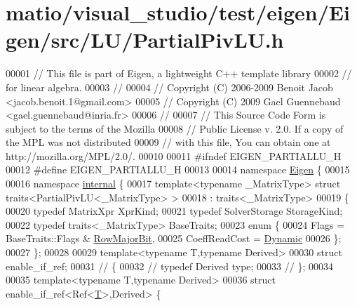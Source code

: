 \hypertarget{matio_2visual__studio_2test_2eigen_2_eigen_2src_2_l_u_2_partial_piv_l_u_8h_source}{}\section{matio/visual\+\_\+studio/test/eigen/\+Eigen/src/\+L\+U/\+Partial\+Piv\+LU.h}
\label{matio_2visual__studio_2test_2eigen_2_eigen_2src_2_l_u_2_partial_piv_l_u_8h_source}

\begin{DoxyCode}
00001 \textcolor{comment}{// This file is part of Eigen, a lightweight C++ template library}
00002 \textcolor{comment}{// for linear algebra.}
00003 \textcolor{comment}{//}
00004 \textcolor{comment}{// Copyright (C) 2006-2009 Benoit Jacob <jacob.benoit.1@gmail.com>}
00005 \textcolor{comment}{// Copyright (C) 2009 Gael Guennebaud <gael.guennebaud@inria.fr>}
00006 \textcolor{comment}{//}
00007 \textcolor{comment}{// This Source Code Form is subject to the terms of the Mozilla}
00008 \textcolor{comment}{// Public License v. 2.0. If a copy of the MPL was not distributed}
00009 \textcolor{comment}{// with this file, You can obtain one at http://mozilla.org/MPL/2.0/.}
00010 
00011 \textcolor{preprocessor}{#ifndef EIGEN\_PARTIALLU\_H}
00012 \textcolor{preprocessor}{#define EIGEN\_PARTIALLU\_H}
00013 
00014 \textcolor{keyword}{namespace }\hyperlink{namespace_eigen}{Eigen} \{
00015 
00016 \textcolor{keyword}{namespace }\hyperlink{namespaceinternal}{internal} \{
00017 \textcolor{keyword}{template}<\textcolor{keyword}{typename} \_MatrixType> \textcolor{keyword}{struct }traits<PartialPivLU<\_MatrixType> >
00018  : traits<\_MatrixType>
00019 \{
00020   \textcolor{keyword}{typedef} MatrixXpr XprKind;
00021   \textcolor{keyword}{typedef} SolverStorage StorageKind;
00022   \textcolor{keyword}{typedef} traits<\_MatrixType> BaseTraits;
00023   \textcolor{keyword}{enum} \{
00024     Flags = BaseTraits::Flags & \hyperlink{group__flags_gae4f56c2a60bbe4bd2e44c5b19cbe8762}{RowMajorBit},
00025     CoeffReadCost = \hyperlink{namespace_eigen_ad81fa7195215a0ce30017dfac309f0b2}{Dynamic}
00026   \};
00027 \};
00028 
00029 \textcolor{keyword}{template}<\textcolor{keyword}{typename} T,\textcolor{keyword}{typename} Derived>
00030 \textcolor{keyword}{struct }enable\_if\_ref;
00031 \textcolor{comment}{// \{}
00032 \textcolor{comment}{//   typedef Derived type;}
00033 \textcolor{comment}{// \};}
00034 
00035 \textcolor{keyword}{template}<\textcolor{keyword}{typename} T,\textcolor{keyword}{typename} Derived>
00036 \textcolor{keyword}{struct }enable\_if\_ref<Ref<\hyperlink{group___sparse_core___module_class_eigen_1_1_triplet}{T}>,Derived> \{

\end{DoxyCode}
